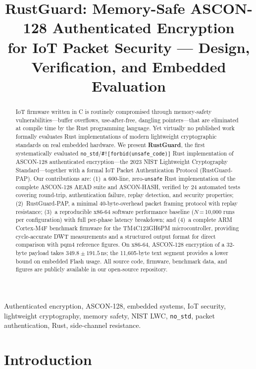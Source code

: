 \documentclass[anonymous]{ndss}
\title{RustGuard: Memory-Safe ASCON-128 Authenticated Encryption\\
       for IoT Packet Security — Design, Verification, and Embedded Evaluation}
\author{}
\newcommand{\code}[1]{\mbox{\texttt{#1}}}
\newcommand{\nstd}{\texttt{no\_std}}
\newcommand{\forbid}{\code{\#![forbid(unsafe\_code)]}}
\begin{document}
\maketitle

\begin{abstract}
IoT firmware written in C is routinely compromised through memory-safety
vulnerabilities---buffer overflows, use-after-free, dangling pointers---that
are eliminated at compile time by the Rust programming language.
Yet virtually no published work formally evaluates Rust implementations of
modern lightweight cryptographic standards on real embedded hardware.
We present \textbf{RustGuard}, the first systematically evaluated
\nstd{}/\forbid{} Rust implementation of ASCON-128 authenticated
encryption---the 2023 NIST Lightweight Cryptography Standard---together
with a formal IoT Packet Authentication Protocol (RustGuard-PAP).
Our contributions are: (1)~a 600-line, zero-\texttt{unsafe} Rust
implementation of the complete ASCON-128 AEAD suite and ASCON-HASH,
verified by 24 automated tests covering round-trip, authentication failure,
replay detection, and security properties; (2)~RustGuard-PAP, a minimal
40-byte-overhead packet framing protocol with replay resistance; (3)~a
reproducible x86-64 software performance baseline ($N$\,=\,10{,}000 runs
per configuration) with full per-phase latency breakdown; and (4)~a
complete ARM Cortex-M4F benchmark firmware for the TM4C123GH6PM
microcontroller, providing cycle-accurate DWT measurements and a structured
output format for direct comparison with pqm4 reference figures.
On x86-64, ASCON-128 encryption of a 32-byte payload takes
$349.8\pm191.5$\,ns; the 11{,}605-byte text segment provides a lower
bound on embedded Flash usage.
All source code, firmware, benchmark data, and figures are publicly
available in our open-source repository.
\end{abstract}

\begin{IEEEkeywords}
Authenticated encryption, ASCON-128, embedded systems, IoT security,
lightweight cryptography, memory safety, NIST LWC, \nstd{}, packet
authentication, Rust, side-channel resistance.
\end{IEEEkeywords}

\section{Introduction}
\label{sec:intro}
\end{document}
